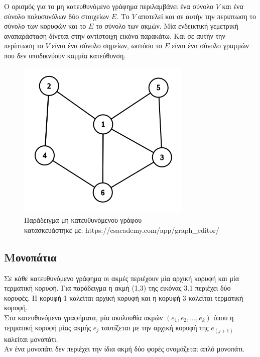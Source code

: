 \documentclass[oneside,12pt]{book}
\newenvironment{matlab}
	{\begin{figure}[hp]\centering\captionsetup{justification=centering}}
	{\end{figure}}
\theoremstyle{definition}
\begin{document}
Ο ορισμός για το μη κατευθυνόμενο γράφημα περιλαμβάνει ένα σύνολο \(V\) και ένα σύνολο πολυσυνόλων δύο στοιχείων \(E\). Το \(V\) αποτελεί και σε αυτήν την περιπτωση το σύνολο των κορυφών και το \(E\) το σύνολο των ακμών. Μία ενδεικτική γεμετρική αναπαράσταση δίνεται στην αντίστοιχη εικόνα παρακάτω. Και σε αυτήν την περίπτωση το \(V\) είναι ένα σύνολο σημείων, ωστόσο το \(E\) είναι ένα σύνολο γραμμών που δεν υποδικνύουν καμμία κατεύθυνση. \\

\begin{matlab}
	\includegraphics[scale=0.8]{images/undirected_graph_example.png}
	\caption{Παράδειγμα μη κατευθυνόμενου γράφου \\ κατασκευάστηκε με: https://csacademy.com/app/graph\_editor/}
\end{matlab}   

\subsection{Μονοπάτια}

Σε κάθε κατευθυνόμενο γράφημα οι ακμές περιέχουν μία αρχική κορυφή και μία τερματική κορυφή. Για παράδειγμα η ακμή (1,3) της εικόνας 3.1 περιέχει δύο κορυφές. Η κορυφή 1 καλείται αρχική κορυφή και η κορυφή 3 καλείται τερματική κορυφή. \\

Στα κατευθυνόμενα γραφήματα, μία ακολουθία ακμών \((e_1, e_2,...,e_k)\) όπου η τερματική κορυφή μίας ακμής \(e_j\) ταυτίζεται με την αρχική κορυφή της \(e_{(j+1)}\) καλείται μονοπάτι. \\

Αν ένα μονοπάτι δεν περιέχει την ίδια ακμή δύο φορές ονομάζεται απλό μονοπάτι. \\
\end{document}
